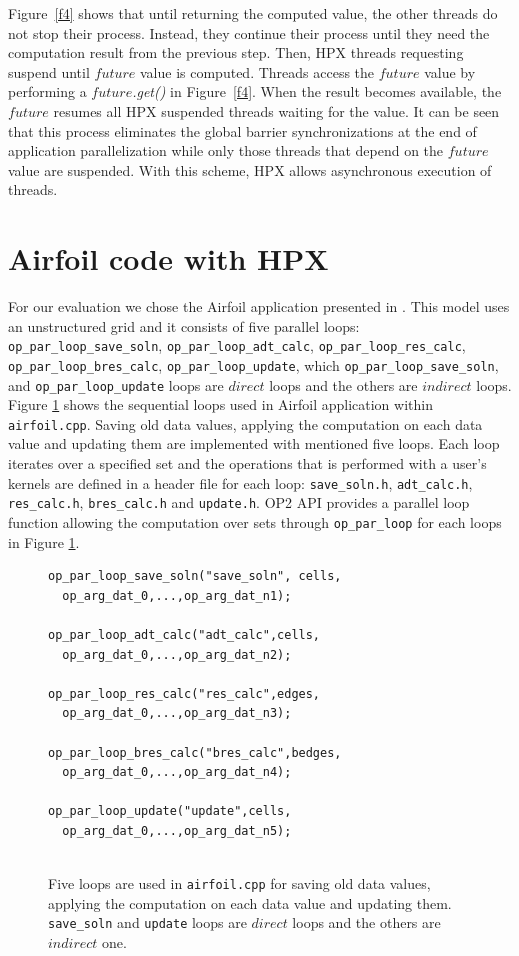 \documentclass[conference]{IEEEtran}
\begin{document}
Figure~\ref{f4} shows that until returning the computed value, the other threads do not stop their process. Instead, they continue their process until they need the computation result from the previous step. Then, HPX threads requesting suspend until $future$ value is computed. Threads access the $future$ value by performing a \textit{$future$.get()} in Figure~\ref{f4}. When the result becomes available, the \textit{$future$} resumes all HPX suspended threads waiting for the value. It can be seen that this process eliminates the global barrier synchronizations at the end of application parallelization while only those threads that depend on the $future$ value are suspended. With this scheme, HPX allows asynchronous execution of threads.


\section{Airfoil code with HPX}
\label{sec:air}

For our evaluation we chose the Airfoil application presented in \cite{o8}. This model uses an unstructured grid and it consists of five parallel loops: \texttt{op\_par\_loop\_save\_soln}, \texttt{op\_par\_loop\_adt\_calc}, \texttt{op\_par\_loop\_res\_calc}, \texttt{op\_par\_loop\_bres\_calc}, \texttt{op\_par\_loop\_update}, which \texttt{op\_par\_loop\_save\_soln},  and \texttt{op\_par\_loop\_update} loops are $direct$ loops and the others are $indirect$ loops. Figure \ref{l1} shows the sequential loops used in Airfoil application within \texttt{airfoil.cpp}. Saving old data values, applying the computation on each data value and updating them are implemented with mentioned five loops. Each loop iterates over a specified set and the operations that is performed with a user's kernels are defined in a header file for each loop: \texttt{save\_soln.h}, \texttt{adt\_calc.h}, \texttt{res\_calc.h}, \texttt{bres\_calc.h} and \texttt{update.h}.  OP2 API provides a parallel loop function allowing the computation over sets through \texttt{op\_par\_loop} for each loops in Figure \ref{l1}. 

\begin{figure} [!h]
    \begin{lstlisting}
op_par_loop_save_soln("save_soln", cells,
  op_arg_dat_0,...,op_arg_dat_n1);
  
op_par_loop_adt_calc("adt_calc",cells,
  op_arg_dat_0,...,op_arg_dat_n2);
  
op_par_loop_res_calc("res_calc",edges,
  op_arg_dat_0,...,op_arg_dat_n3);

op_par_loop_bres_calc("bres_calc",bedges,
  op_arg_dat_0,...,op_arg_dat_n4);
  
op_par_loop_update("update",cells,
  op_arg_dat_0,...,op_arg_dat_n5);
  
    \end{lstlisting}
    \caption{\small{Five loops are used in \texttt{airfoil.cpp} for saving old data values, applying the computation on each data value and updating them. \texttt{save\_soln} and \texttt{update} loops are $direct$ loops and the others are $indirect$ one.}}
    \label{l1}
\end{figure}
\end{document}
